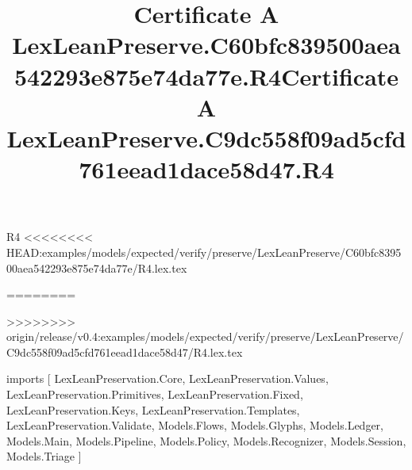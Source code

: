 \begin{lexlean}{R4}
<<<<<<<< HEAD:examples/models/expected/verify/preserve/LexLeanPreserve/C60bfc839500aea542293e875e74da77e/R4.lex.tex
\title{Certificate A LexLeanPreserve.C60bfc839500aea542293e875e74da77e.R4}
========
\title{Certificate A LexLeanPreserve.C9dc558f09ad5cfd761eead1dace58d47.R4}
>>>>>>>> origin/release/v0.4:examples/models/expected/verify/preserve/LexLeanPreserve/C9dc558f09ad5cfd761eead1dace58d47/R4.lex.tex
\begin{coremodule}
imports [
  LexLeanPreservation.Core,
  LexLeanPreservation.Values,
  LexLeanPreservation.Primitives,
  LexLeanPreservation.Fixed,
  LexLeanPreservation.Keys,
  LexLeanPreservation.Templates,
  LexLeanPreservation.Validate,
  Models.Flows,
  Models.Glyphs,
  Models.Ledger,
  Models.Main,
  Models.Pipeline,
  Models.Policy,
  Models.Recognizer,
  Models.Session,
  Models.Triage
]


\end{coremodule}
\end{lexlean}

